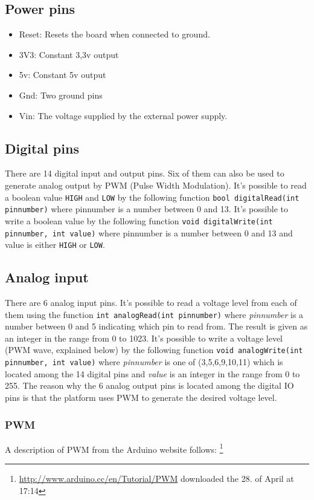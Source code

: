 \documentclass[a4paper, oneside, final]{memoir}
\begin{document}
\subsection{Power pins}
\begin{itemize}
\item Reset: Resets the board when connected to ground.
\item 3V3: Constant 3,3v output
\item 5v: Constant 5v output
\item Gnd: Two ground pins
\item Vin: The voltage supplied by the external power supply.
\end{itemize}

\subsection{Digital pins}

There are 14 digital input and output pins. Six of them can also be
used to generate analog output by PWM (Pulse Width Modulation). It's
possible to read a boolean value \texttt{HIGH} and \texttt{LOW} by the
following function \texttt{bool digitalRead(int pinnumber)} where
pinnumber is a number between 0 and 13. It's possible to write a
boolean value by the following function \texttt{void digitalWrite(int
  pinnumber, int value)} where pinnumber is a number between 0 and 13
and value is either \texttt{HIGH} or \texttt{LOW}.

\subsection{Analog input}
There are 6 analog input pins. It's possible to read a voltage level
from each of them using the function \texttt{int analogRead(int
  pinnumber)} where \textit{pinnumber} is a number between 0 and 5
indicating which pin to read from. The result is given as an integer
in the range from 0 to 1023. It's possible to write a voltage level
(PWM wave, explained below) by the following function \texttt{void
  analogWrite(int pinnumber, int value)} where \textit{pinnumber} is
one of (3,5,6,9,10,11) which is located among the 14 digital pins and
\textit{value} is an integer in the range from 0 to 255. The reason
why the 6 analog output pins is located among the digital IO pins is
that the platform uses PWM to generate the desired voltage level.

\subsubsection{PWM}
\label{pwm}
A description of PWM from the Arduino website follows:
\footnote{\url{http://www.arduino.cc/en/Tutorial/PWM} downloaded the
  28. of April at 17:14}
\end{document}
